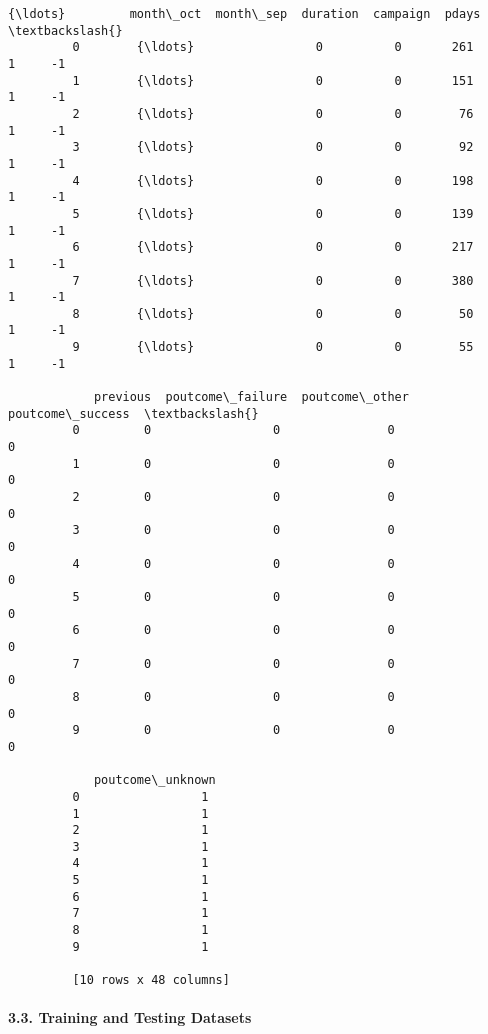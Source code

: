 \documentclass[11pt]{article}
\begin{document}
\begin{Verbatim}[commandchars=\\\{\}]
                  {\ldots}         month\_oct  month\_sep  duration  campaign  pdays  \textbackslash{}
         0        {\ldots}                 0          0       261         1     -1   
         1        {\ldots}                 0          0       151         1     -1   
         2        {\ldots}                 0          0        76         1     -1   
         3        {\ldots}                 0          0        92         1     -1   
         4        {\ldots}                 0          0       198         1     -1   
         5        {\ldots}                 0          0       139         1     -1   
         6        {\ldots}                 0          0       217         1     -1   
         7        {\ldots}                 0          0       380         1     -1   
         8        {\ldots}                 0          0        50         1     -1   
         9        {\ldots}                 0          0        55         1     -1   
         
            previous  poutcome\_failure  poutcome\_other  poutcome\_success  \textbackslash{}
         0         0                 0               0                 0   
         1         0                 0               0                 0   
         2         0                 0               0                 0   
         3         0                 0               0                 0   
         4         0                 0               0                 0   
         5         0                 0               0                 0   
         6         0                 0               0                 0   
         7         0                 0               0                 0   
         8         0                 0               0                 0   
         9         0                 0               0                 0   
         
            poutcome\_unknown  
         0                 1  
         1                 1  
         2                 1  
         3                 1  
         4                 1  
         5                 1  
         6                 1  
         7                 1  
         8                 1  
         9                 1  
         
         [10 rows x 48 columns]
\end{Verbatim}
            
    \paragraph{3.3. Training and Testing
Datasets}\label{training-and-testing-datasets}
\end{document}
